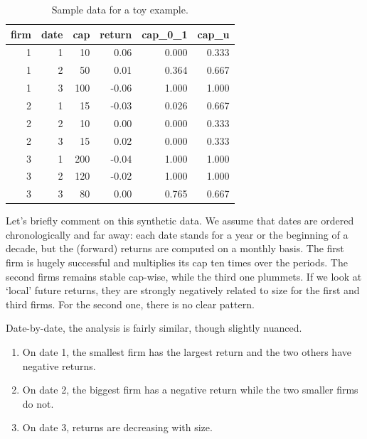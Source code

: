 \documentclass[]{krantz}
\providecommand{\tightlist}{%
  \setlength{\itemsep}{0pt}\setlength{\parskip}{0pt}}
\theoremstyle{definition}
\theoremstyle{definition}
\theoremstyle{definition}
\theoremstyle{remark}
\begin{document}
\begin{table}[t]

\caption{\label{tab:fakedata}Sample data for a toy example.}
\centering
\begin{tabular}{r|r|r|r|r|r}
\hline
firm & date & cap & return & cap\_0\_1 & cap\_u\\
\hline
1 & 1 & 10 & 0.06 & 0.000 & 0.333\\
\hline
1 & 2 & 50 & 0.01 & 0.364 & 0.667\\
\hline
1 & 3 & 100 & -0.06 & 1.000 & 1.000\\
\hline
2 & 1 & 15 & -0.03 & 0.026 & 0.667\\
\hline
2 & 2 & 10 & 0.00 & 0.000 & 0.333\\
\hline
2 & 3 & 15 & 0.02 & 0.000 & 0.333\\
\hline
3 & 1 & 200 & -0.04 & 1.000 & 1.000\\
\hline
3 & 2 & 120 & -0.02 & 1.000 & 1.000\\
\hline
3 & 3 & 80 & 0.00 & 0.765 & 0.667\\
\hline
\end{tabular}
\end{table}

\normalsize

Let's briefly comment on this synthetic data. We assume that dates are
ordered chronologically and far away: each date stands for a year or the
beginning of a decade, but the (forward) returns are computed on a
monthly basis. The first firm is hugely successful and multiplies its
cap ten times over the periods. The second firms remains stable
cap-wise, while the third one plummets. If we look at `local' future
returns, they are strongly negatively related to size for the first and
third firms. For the second one, there is no clear pattern.

Date-by-date, the analysis is fairly similar, though slightly nuanced.

\begin{enumerate}
\def\labelenumi{\arabic{enumi}.}
\tightlist
\item
  On date 1, the smallest firm has the largest return and the two others
  have negative returns.\\
\item
  On date 2, the biggest firm has a negative return while the two
  smaller firms do not.\\
\item
  On date 3, returns are decreasing with size.
\end{enumerate}
\end{document}
